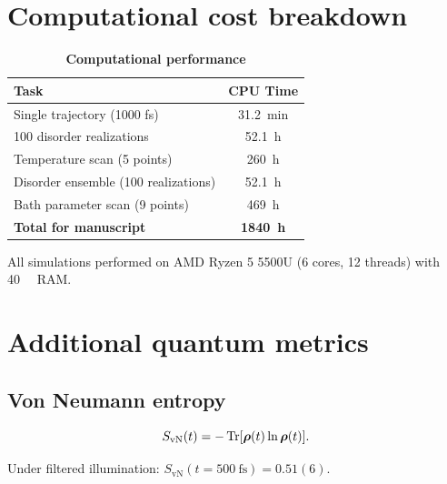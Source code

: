 \documentclass[11pt,a4paper]{article}
\begin{document}

\section{Computational cost breakdown}

\begin{table}[h]
\centering
\caption{\textbf{Computational performance}}
\label{tab:SI_performance}
\begin{tabular}{lc}
\toprule
\textbf{Task} & \textbf{CPU Time} \\
\midrule
Single trajectory (1000 fs) & \SI{31.2}{\minute} \\
100 disorder realizations & \SI{52.1}{\hour} \\
Temperature scan (5 points) & \SI{260}{\hour} \\
Disorder ensemble (100 realizations) & \SI{52.1}{\hour} \\
Bath parameter scan (9 points) & \SI{469}{\hour} \\
\midrule
\textbf{Total for manuscript} & \textbf{\SI{1840}{\hour}} \\
\bottomrule
\end{tabular}
\end{table}

All simulations performed on AMD Ryzen 5 5500U (6 cores, 12 threads) with \SI{40}{\giga\byte} RAM.


\section{Additional quantum metrics}

\subsection{Von Neumann entropy}

\begin{equation}
S_{\mathrm{vN}}(t) = -\Tr[\vb*{\rho}(t)\ln\vb*{\rho}(t)].
\label{eq:SI_von_neumann}
\end{equation}

Under filtered illumination: $S_{\mathrm{vN}}(t=\SI{500}{\femto\second}) = 0.51(6)$.
\end{document}

